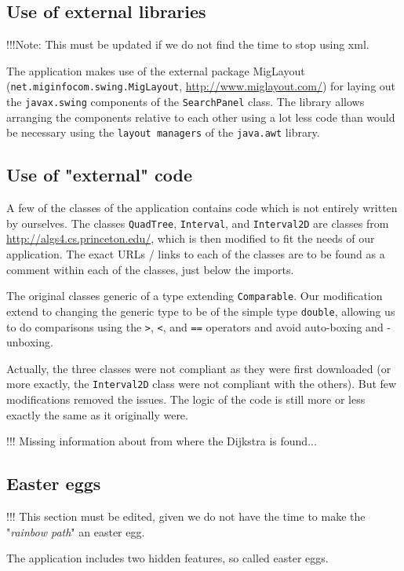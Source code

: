 \documentclass[a4paper,11pt]{article}
\begin{document}
\subsection{Use of external libraries}
!!!Note: This must be updated if we do not find the time to stop using xml.

The application makes use of the external package MigLayout (\texttt{net.miginfocom.swing.MigLayout}, \url{http://www.miglayout.com/}) for laying out the \texttt{javax.swing} components of the \texttt{SearchPanel} class. The library allows arranging the components relative to each other using a lot less code than would be necessary using the \texttt{layout managers} of the \texttt{java.awt} library.

\subsection{Use of "external" code}
A few of the classes of the application contains code which is not entirely written by ourselves. The classes \texttt{QuadTree}, \texttt{Interval}, and \texttt{Interval2D} are classes from \url{http://algs4.cs.princeton.edu/}, which is then modified to fit the needs of our application. The exact URLs / links to each of the classes are to be found as a comment within each of the classes, just below the imports.

The original classes generic of a type extending \texttt{Comparable}. Our modification extend to changing the generic type to be of the simple type \texttt{double}, allowing us to do comparisons using the \texttt{>}, \texttt{<}, and \texttt{==} operators and avoid auto-boxing and -unboxing.

Actually, the three classes were not compliant as they were first downloaded (or more exactly, the \texttt{Interval2D} class were not compliant with the others). But few modifications removed the issues. The logic of the code is still more or less exactly the same as it originally were.

!!! Missing information about from where the Dijkstra is found...

\subsection{Easter eggs}
!!! This section must be edited, given we do not have the time to make the "\textit{rainbow path}" an easter egg.

The application includes two hidden features, so called easter eggs.
\end{document}
